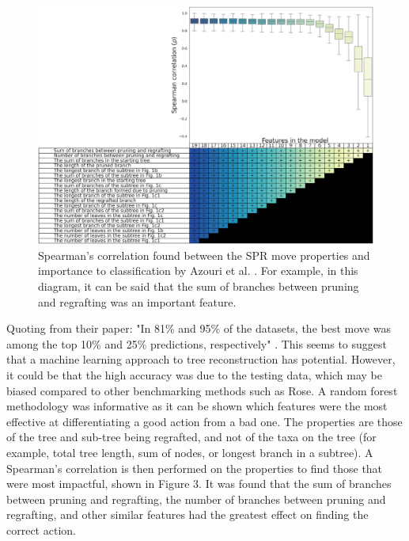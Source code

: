 \documentclass{mpaper}
\begin{document}
\begin{figure}
    \includegraphics[width=1\linewidth]{dissertation/images/spearman_azouri_biomlpaper.png}
    \centering
    \caption{Spearman's correlation found between the SPR move properties and importance to classification by Azouri et al. \cite{bioMLPaper}. For example, in this diagram, it can be said that the sum of branches between pruning and regrafting was an important feature.}
\end{figure}

Quoting from their paper: "In 81\% and 95\% of the datasets, the best move was among the top 10\% and 25\% predictions, respectively" \cite{bioMLPaper}. This seems to suggest that a machine learning approach to tree reconstruction has potential. However, it could be that the high accuracy was due to the testing data, which may be biased compared to other benchmarking methods such as Rose. A random forest methodology was informative as it can be shown which features were the most effective at differentiating a good action from a bad one. The properties are those of the tree and sub-tree being regrafted, and not of the taxa on the tree (for example, total tree length, sum of nodes, or longest branch in a subtree). A Spearman's correlation is then performed on the properties to find those that were most impactful, shown in Figure 3. It was found that the sum of branches between pruning and regrafting, the number of branches between pruning and regrafting, and other similar features had the greatest effect on finding the correct action. 
\end{document}
